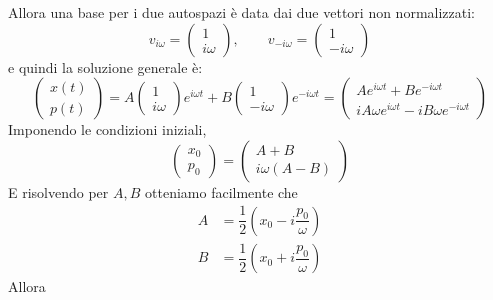 \documentclass[a4paper,openany]{article}
\begin{document}
	Allora una base per i due autospazi è data dai due vettori non normalizzati:
	\begin{equation}\label{key}
		v_{i\omega} =
		\begin{pmatrix}
			1 \\ i\omega
		\end{pmatrix},
		\quad \quad
		v_{-i\omega} =
		\begin{pmatrix}
			1 \\ -i\omega
		\end{pmatrix}
	\end{equation}
	e quindi la soluzione generale è:
	\begin{equation}\label{key}
		\begin{pmatrix}
			x(t) \\ p(t)
		\end{pmatrix}
		= A \begin{pmatrix}
			1\\i\omega
		\end{pmatrix}e^{i\omega t} +  B \begin{pmatrix}
			1\\-i\omega
		\end{pmatrix}e^{-i\omega t} = 
		\begin{pmatrix}
			Ae^{i\omega t} + B e^{-i\omega t} \\
			iA\omega e^{i\omega t} - iB\omega e^{-i\omega t}
		\end{pmatrix}
	\end{equation}
	Imponendo le condizioni iniziali,
	\begin{equation}\label{key}
		\begin{pmatrix}
			x_0 \\ p_0
		\end{pmatrix}
		= 
		\begin{pmatrix}
			A + B\\
			i\omega (A-B)
		\end{pmatrix}
	\end{equation}
	E risolvendo per $A,B$ otteniamo facilmente che
	\begin{equation}\label{key}
		\begin{aligned}
			A &= \dfrac{1}{2}(x_0 - i \dfrac{p_0}{\omega}) \\
			B &= \dfrac{1}{2}(x_0 + i \dfrac{p_0}{\omega}) 
		\end{aligned}
	\end{equation}
	Allora
\end{document}
